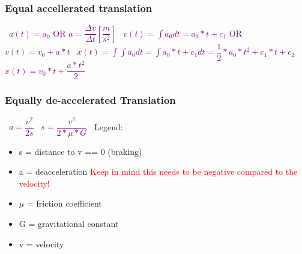 \documentclass[main.tex,fontsize=8pt,paper=a4,paper=portrait,DIV=calc,]{scrartcl}
\begin{document}
\begin{multicols*}{2}
\subsubsection{Equal accellerated translation}
\, \newline
\large \textcolor{purple}{\( a(t) = a_0 \) OR \(a = \dfrac{\Delta v}{\Delta t} [\dfrac{m}{s^2}]\) }\newline
\, \newline
\large \textcolor{purple}{\( v(t) = \int{a_0 dt} = a_0 * t + c_1 \) OR \(v(t) = v_0 + a * t\)}\newline
\, \newline
\large \textcolor{purple}{\( x(t) = \int{\int{ a_0 dt }} = \int{a_0 * t + c_1 dt} = \dfrac{1}{2}* a_0 * t^2 + c_1 * t + c_2\)}\newline
\, \newline
\large \textcolor{purple}{\( x(t) = v_0 * t + \dfrac{a * t^2}{2} \)}\newline
\, \newline
\normalsize 

\subsubsection{Equally de-accelerated Translation}
\, \newline
\large \textcolor{purple}{\( a = \dfrac{v^2}{2s} \)}\newline
\, \newline
\large \textcolor{purple}{\( s = \dfrac{v^2}{2 * \mu * G} \)}
\, \newline
\normalsize Legend: \newline
\begin{itemize}
\item s = distance to v == 0 (braking)
\item a = deacceleration\newline
\textcolor{red}{Keep in mind this needs to be negative compared to the velocity!}
\item \(\mu\) = friction coefficient
\item G = gravitational constant
\item v = velocity
\end{itemize} 


\end{multicols*}
\end{document}
